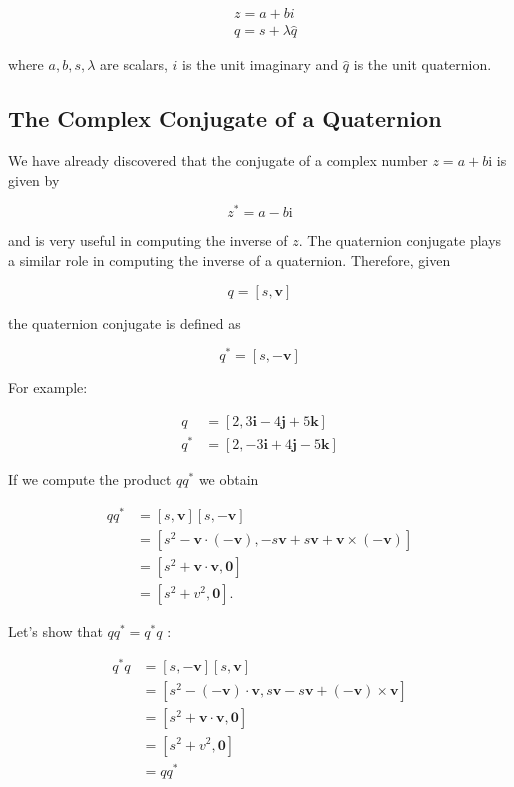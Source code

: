 \documentclass[10pt]{article}
\begin{document}
$$
\begin{aligned}
& z=a+b i \\
& q=s+\lambda \hat{q}
\end{aligned}
$$

where $a, b, s, \lambda$ are scalars, $i$ is the unit imaginary and $\hat{q}$ is the unit quaternion.

\subsection{The Complex Conjugate of a Quaternion}
We have already discovered that the conjugate of a complex number $z=a+b \mathrm{i}$ is given by

$$
z^{*}=a-b \mathrm{i}
$$

and is very useful in computing the inverse of $z$. The quaternion conjugate plays a similar role in computing the inverse of a quaternion. Therefore, given

$$
q=[s, \mathbf{v}]
$$

the quaternion conjugate is defined as

$$
q^{*}=[s,-\mathbf{v}]
$$

For example:

$$
\begin{aligned}
q & =[2,3 \mathbf{i}-4 \mathbf{j}+5 \mathbf{k}] \\
q^{*} & =[2,-3 \mathbf{i}+4 \mathbf{j}-5 \mathbf{k}]
\end{aligned}
$$

If we compute the product $q q^{*}$ we obtain

$$
\begin{aligned}
q q^{*} & =[s, \mathbf{v}][s,-\mathbf{v}] \\
& =\left[s^{2}-\mathbf{v} \cdot(-\mathbf{v}),-s \mathbf{v}+s \mathbf{v}+\mathbf{v} \times(-\mathbf{v})\right] \\
& =\left[s^{2}+\mathbf{v} \cdot \mathbf{v}, \mathbf{0}\right] \\
& =\left[s^{2}+v^{2}, \mathbf{0}\right] .
\end{aligned}
$$

Let's show that $q q^{*}=q^{*} q$ :

$$
\begin{aligned}
q^{*} q & =[s,-\mathbf{v}][s, \mathbf{v}] \\
& =\left[s^{2}-(-\mathbf{v}) \cdot \mathbf{v}, s \mathbf{v}-s \mathbf{v}+(-\mathbf{v}) \times \mathbf{v}\right] \\
& =\left[s^{2}+\mathbf{v} \cdot \mathbf{v}, \mathbf{0}\right] \\
& =\left[s^{2}+v^{2}, \mathbf{0}\right] \\
& =q q^{*}
\end{aligned}
$$
\end{document}

